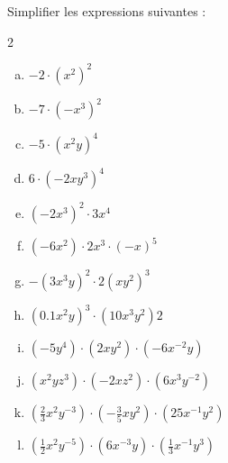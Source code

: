 \documentclass[twoside, a4paper, 12pt, openright, fullpage]{book}
\begin{document}
\begin{exercice}\label{littéral1}
Simplifier les expressions suivantes :
\begin{multicols}{2}
\begin{enumerate}[a)]
    \item $-2\cdot \left( x^2\right) ^2$
    \item $-7\cdot \left(-x^3\right)^2$
    \item $-5\cdot \left( x^2y \right)^4$
    \item $6\cdot \left(-2xy^3\right)^4$
    \item $\left(-2x^3\right)^2 \cdot 3x^4$
    \item $\left(-6x^2\right) \cdot 2x^3 \cdot \left(-x\right)^5$
    \item $-\left(3x^3y\right)^2 \cdot 2\left(xy^2\right)^3$
    \item $\left(0.1 x^2y\right)^3 \cdot \left(10x^3y^2\right)2$
    \item $\left(-5y^4\right)\cdot \left(2xy^2\right) \cdot\left(-6x^{-2}y\right)$
    \item $\left(x^2yz^3\right) \cdot \left(-2xz^2\right)\cdot \left(6x^3y^{-2}\right)$
    \item $\left(\frac{2}{3}x^2y^{-3}\right) \cdot \left(-\frac{3}{5}xy^2\right) \cdot \left(25x^{-1}y^2\right)$
    \item $\left(\frac{1}{2}x^2y^{-5} \right) \cdot \left(6x^{-3}y\right) \cdot \left(\frac{1}{3}x^{-1}y^3\right)$
    \end{enumerate}
\end{multicols}
\end{exercice}
\end{document}
